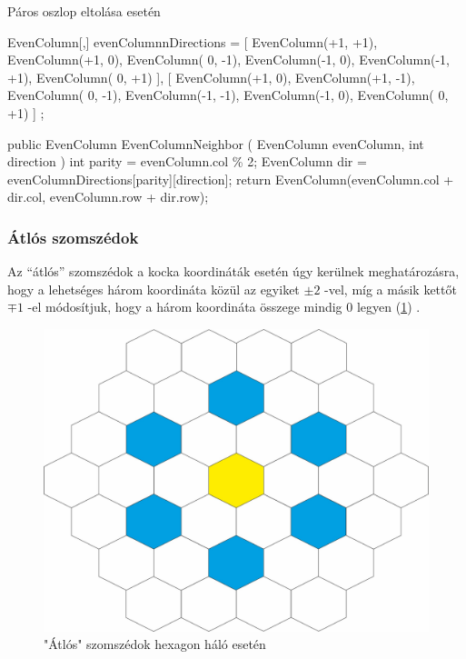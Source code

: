 Páros oszlop eltolása esetén
\begin{cpp}
EvenColumn[,] evenColumnnDirections = 
{ 
   [ 
      EvenColumn(+1, +1), EvenColumn(+1,  0), EvenColumn( 0, -1),
      EvenColumn(-1,  0), EvenColumn(-1, +1), EvenColumn( 0, +1) 
   ],
   [  
      EvenColumn(+1,  0), EvenColumn(+1, -1), EvenColumn( 0, -1),
      EvenColumn(-1, -1), EvenColumn(-1,  0), EvenColumn( 0, +1) 
   ]
};

public EvenColumn EvenColumnNeighbor
(
   EvenColumn evenColumn, 
   int direction
)
{
   int parity = evenColumn.col \% 2;
   EvenColumn dir = evenColumnDirections[parity][direction];
   return EvenColumn(evenColumn.col + dir.col, evenColumn.row + dir.row);
}   
\end{cpp}

\subsubsection{Átlós szomszédok}

\noindent Az “átlós” szomszédok a kocka koordináták esetén úgy kerülnek meghatározásra, hogy a lehetséges három koordináta közül az egyiket $ \pm 2$ -vel, míg a másik kettőt $\mp 1$ -el módosítjuk, hogy a három koordináta összege mindig $0$ legyen (\ref{fig:Diagonals}) \cite{Neighbors_Diagonal}.

\begin{figure}[h!]
\centering
\includegraphics[scale=0.3]{kepek/Diagonals.jpg}
\caption{"Átlós" szomszédok hexagon háló esetén}
\label{fig:Diagonals}
\end{figure}

